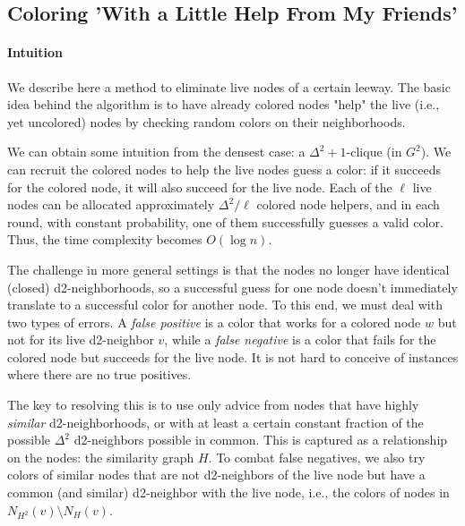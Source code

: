 \subsection{Coloring 'With a Little Help From My Friends'}

\paragraph{Intuition}
We describe here a method to eliminate live nodes of a certain leeway.
The basic idea behind the algorithm is to have already colored nodes "help" the live (i.e., yet uncolored) nodes by checking random colors on their neighborhoods.

We can obtain some intuition from the densest case: a $\Delta^2+1$-clique (in $G^2$).
We can recruit the colored nodes to help the live nodes guess a color: if it succeeds for the colored node, it will also succeed for the live node. Each of the $\ell$ live nodes can be allocated approximately $\Delta^2/\ell$ colored node helpers, and in each round, with constant probability, one of them successfully guesses a valid color. Thus, the time complexity becomes $O(\log n)$. 

The challenge in more general settings is that the nodes no longer have identical (closed) d2-neighborhoods, so a successful guess for one node doesn't immediately translate to a successful color for another node.
To this end, we must deal with two types of errors.
A \emph{false positive} is a color that works for a colored node $w$ but not for its live d2-neighbor $v$, while a \emph{false negative} is a color that fails for the colored node but succeeds for the live node.
It is not hard to conceive of instances where there are no true positives.

The key to resolving this is to use only advice from nodes that have highly \emph{similar} d2-neighborhoods, or with at least a certain constant fraction of the possible $\Delta^2$ d2-neighbors possible in common. This is captured as a relationship on the nodes: the similarity graph $H$.
To combat false negatives, we also try colors of similar nodes that are not d2-neighbors of the live node but have a common (and similar) d2-neighbor with the live node, i.e., the colors of nodes in $N_{H^2}(v) \setminus N_H(v)$.


